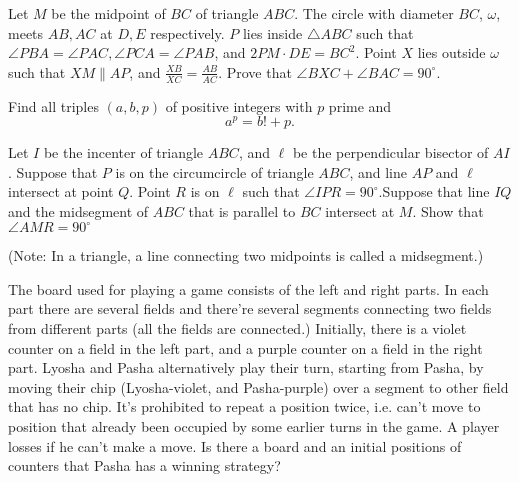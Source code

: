 \documentclass[11pt]{scrartcl}
\begin{document}
\begin{problem}[591652153716935]
	Let $M$ be the midpoint of $BC$ of triangle $ABC$. The circle with diameter $BC$, $\omega$, meets $AB,AC$ at $D,E$ respectively. $P$ lies inside $\triangle ABC$ such that $\angle PBA=\angle PAC, \angle PCA=\angle PAB$, and $2PM\cdot DE=BC^2$. Point $X$ lies outside $\omega$ such that $XM\parallel AP$, and $\frac{XB}{XC}=\frac{AB}{AC}$. Prove that $\angle BXC +\angle BAC=90^{\circ}$.
\end{problem}
\begin{problem}[627600286851318227]
Find all triples $(a,b,p)$ of positive integers with $p$ prime and\[ a^p=b!+p. \]
\end{problem}
\begin{problem}[908587245178389]
Let $I$ be the incenter of triangle $ABC$, and $\ell$ be the perpendicular bisector of $AI$. Suppose that $P$ is on the circumcircle of triangle $ABC$, and line $AP$ and $\ell$ intersect at point $Q$. Point $R$ is on $\ell$ such that $\angle IPR = 90^{\circ}$.Suppose that line $IQ$ and the midsegment of $ABC$ that is parallel to $BC$ intersect at $M$. Show that $\angle AMR = 90^{\circ}$

(Note: In a triangle, a line connecting two midpoints is called a midsegment.)
\end{problem}
\begin{problem}[297728211754501]
The board used for playing a game consists of the left and right parts. In each part there are several fields and there’re several segments connecting two fields from different parts (all the fields are connected.) Initially, there is a violet counter on a field in the left part, and a purple counter on a field in the right part. Lyosha and Pasha alternatively play their turn, starting from Pasha, by moving their chip (Lyosha-violet, and Pasha-purple) over a segment to other field that has no chip. It’s prohibited to repeat a position twice, i.e. can’t move to position that already been occupied by some earlier turns in the game. A player losses if he can’t make a move. Is there a board and an initial positions of counters that Pasha has a winning strategy?
\end{problem}
\end{document}
